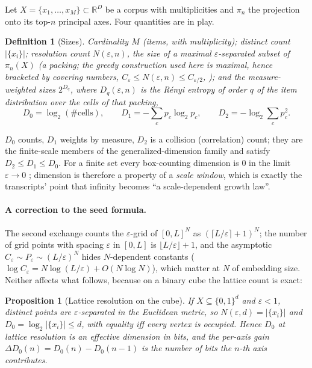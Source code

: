 \documentclass[11pt,a4paper]{article}
\theoremstyle{plain}
\newtheorem{proposition}{Proposition}
\newtheorem{definition}{Definition}
\theoremstyle{remark}
\begin{document}
Let $X=\{x_1,\dots,x_M\}\subset\mathbb{R}^D$ be a corpus with multiplicities and $\pi_n$ the projection onto its top-$n$ principal axes. Four quantities are in play.

\begin{definition}[Sizes]
\emph{Cardinality} $M$ (items, with multiplicity); \emph{distinct count} $|\{x_i\}|$; \emph{resolution count} $N(\varepsilon,n)$, the size of a maximal $\varepsilon$-separated subset of $\pi_n(X)$ (a packing; the greedy construction used here is maximal, hence bracketed by covering numbers, $C_\varepsilon\le N(\varepsilon,n)\le C_{\varepsilon/2}$, \citealp{kolmogorov1959entropy}); and the \emph{measure-weighted} sizes $2^{D_q}$, where $D_q(\varepsilon,n)$ is the Rényi entropy of order $q$ of the item distribution over the cells of that packing,
\begin{equation}
D_0=\log_2(\#\text{cells}),\qquad D_1=-\sum_c p_c\log_2p_c,\qquad D_2=-\log_2\sum_c p_c^2 .\tag{1}
\end{equation}
\end{definition}

$D_0$ counts, $D_1$ weights by measure, $D_2$ is a collision (correlation) count; they are the finite-scale members of the generalized-dimension family \citep{hentschel1983infinite,grassberger1983characterization} and satisfy $D_2\le D_1\le D_0$. For a finite set every box-counting dimension is $0$ in the limit $\varepsilon\to0$ \citep{falconer2014fractal}; dimension is therefore a property of a \emph{scale window}, which is exactly the transcripts' point that infinity becomes ``a scale-dependent growth law''.

\paragraph{A correction to the seed formula.} The second exchange counts the $\varepsilon$-grid of $[0,L]^N$ as $(\lceil L/\varepsilon\rceil+1)^N$; the number of grid points with spacing $\varepsilon$ in $[0,L]$ is $\lfloor L/\varepsilon\rfloor+1$, and the asymptotic $C_\varepsilon\sim P_\varepsilon\sim(L/\varepsilon)^N$ hides $N$-dependent constants ($\log C_\varepsilon=N\log(L/\varepsilon)+O(N\log N)$), which matter at $N$ of embedding size. Neither affects what follows, because on a binary cube the lattice count is exact:

\begin{proposition}[Lattice resolution on the cube]
\label{prop:cube}
If $X\subseteq\{0,1\}^d$ and $\varepsilon<1$, distinct points are $\varepsilon$-separated in the Euclidean metric, so $N(\varepsilon,d)=|\{x_i\}|$ and $D_0=\log_2|\{x_i\}|\le d$, with equality iff every vertex is occupied. Hence $D_0$ at lattice resolution is an effective dimension in bits, and the per-axis gain $\Delta D_0(n)=D_0(n)-D_0(n-1)$ is the number of bits the $n$-th axis contributes.
\end{proposition}
\end{document}

